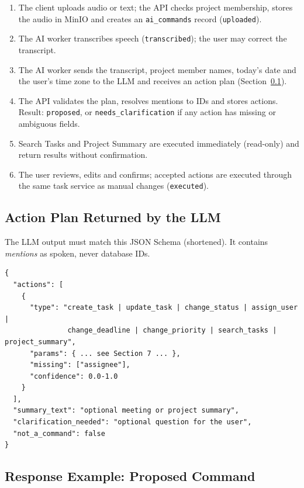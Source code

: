 \documentclass[11pt,a4paper]{article}
\newcommand{\code}[1]{\texttt{#1}}
\begin{document}
\begin{enumerate}
  \item The client uploads audio or text; the API checks project membership, stores the audio in MinIO and creates an \code{ai\_commands} record (\code{uploaded}).
  \item The AI worker transcribes speech (\code{transcribed}); the user may correct the transcript.
  \item The AI worker sends the transcript, project member names, today's date and the user's time zone to the LLM and receives an action plan (Section~\ref{sec:plan}).
  \item The API validates the plan, resolves mentions to IDs and stores actions. Result: \code{proposed}, or \code{needs\_clarification} if any action has missing or ambiguous fields.
  \item Search Tasks and Project Summary are executed immediately (read-only) and return results without confirmation.
  \item The user reviews, edits and confirms; accepted actions are executed through the same task service as manual changes (\code{executed}).
\end{enumerate}

\subsection{Action Plan Returned by the LLM}\label{sec:plan}

The LLM output must match this JSON Schema (shortened). It contains \emph{mentions} as spoken, never database IDs.

\begin{Verbatim}
{
  "actions": [
    {
      "type": "create_task | update_task | change_status | assign_user |
               change_deadline | change_priority | search_tasks | project_summary",
      "params": { ... see Section 7 ... },
      "missing": ["assignee"],
      "confidence": 0.0-1.0
    }
  ],
  "summary_text": "optional meeting or project summary",
  "clarification_needed": "optional question for the user",
  "not_a_command": false
}
\end{Verbatim}

\subsection{Response Example: Proposed Command}
\end{document}
